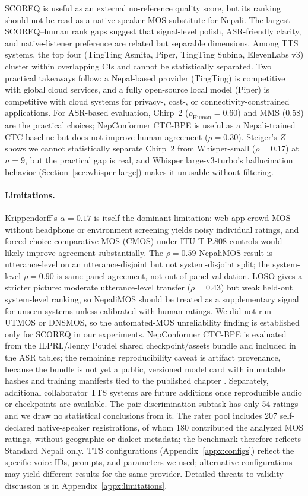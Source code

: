 \documentclass[11pt]{article}
\begin{document}
SCOREQ is useful as an external no-reference quality score, but its ranking should not be read as a native-speaker MOS substitute for Nepali. The largest SCOREQ--human rank gaps suggest that signal-level polish, ASR-friendly clarity, and native-listener preference are related but separable dimensions. Among TTS systems, the top four (TingTing Asmita, Piper, TingTing Subina, ElevenLabs v3) cluster within overlapping CIs and cannot be statistically separated. Two practical takeaways follow: a Nepal-based provider (TingTing) is competitive with global cloud services, and a fully open-source local model (Piper) is competitive with cloud systems for privacy-, cost-, or connectivity-constrained applications. For ASR-based evaluation, Chirp~2 ($\rho_\text{Human} = 0.60$) and MMS ($0.58$) are the practical choices; NepConformer CTC-BPE is useful as a Nepali-trained CTC baseline but does not improve human agreement ($\rho=0.30$). Steiger's $Z$ shows we cannot statistically separate Chirp~2 from Whisper-small ($\rho = 0.17$) at $n = 9$, but the practical gap is real, and Whisper large-v3-turbo's hallucination behavior (Section~\ref{sec:whisper-large}) makes it unusable without filtering.

\paragraph{Limitations.} Krippendorff's $\alpha = 0.17$ is itself the dominant limitation: web-app crowd-MOS without headphone or environment screening yields noisy individual ratings, and forced-choice comparative MOS (CMOS) under ITU-T P.808 controls would likely improve agreement substantially. The $\rho = 0.59$ NepaliMOS result is utterance-level on an utterance-disjoint but not system-disjoint split; the system-level $\rho = 0.90$ is same-panel agreement, not out-of-panel validation. LOSO gives a stricter picture: moderate utterance-level transfer ($\rho = 0.43$) but weak held-out system-level ranking, so NepaliMOS should be treated as a supplementary signal for unseen systems unless calibrated with human ratings. We did not run UTMOS or DNSMOS, so the automated-MOS unreliability finding is established only for SCOREQ in our experiments. NepConformer CTC-BPE is evaluated from the ILPRL/Jenny Poudel shared checkpoint/assets bundle and included in the ASR tables; the remaining reproducibility caveat is artifact provenance, because the bundle is not yet a public, versioned model card with immutable hashes and training manifests tied to the published chapter \citep{poudel2026nepconformer}. Separately, additional collaborator TTS systems are future additions once reproducible audio or checkpoints are available. The pair-discrimination subtask has only 54 ratings and we draw no statistical conclusions from it. The rater pool includes 207 self-declared native-speaker registrations, of whom 180 contributed the analyzed MOS ratings, without geographic or dialect metadata; the benchmark therefore reflects Standard Nepali only. TTS configurations (Appendix~\ref{appx:configs}) reflect the specific voice IDs, prompts, and parameters we used; alternative configurations may yield different results for the same provider. Detailed threats-to-validity discussion is in Appendix~\ref{appx:limitations}.
\end{document}
